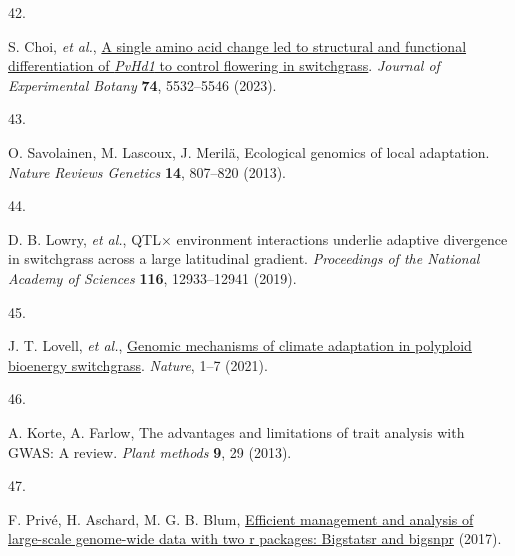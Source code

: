 \documentclass[
  9pt,
  twocolumn,
  twoside]{pnas-new}
\newlength{\cslhangindent}
\newlength{\csllabelwidth}
\newenvironment{CSLReferences}[2] %
 {\begin{list}{}{%
  \setlength{\itemindent}{0pt}
  \setlength{\leftmargin}{0pt}
  \setlength{\parsep}{0pt}
  \ifodd #1
   \setlength{\leftmargin}{\cslhangindent}
   \setlength{\itemindent}{-1\cslhangindent}
  \fi
  \setlength{\itemsep}{#2\baselineskip}}}
 {\end{list}}
\newcommand{\CSLLeftMargin}[1]{\parbox[t]{\csllabelwidth}{\strut#1\strut}}
\newcommand{\CSLRightInline}[1]{\parbox[t]{\linewidth - \csllabelwidth}{\strut#1\strut}}
\begin{document}
\begin{CSLReferences}{0}{1}
\CSLLeftMargin{42. }%
\CSLRightInline{S. Choi, \emph{et al.},
\href{https://doi.org/10.1093/jxb/erad255}{A single amino acid change
led to structural and functional differentiation of {\emph{PvHd1}} to
control flowering in switchgrass}. \emph{Journal of Experimental Botany}
\textbf{74}, 5532--5546 (2023).}

\CSLLeftMargin{43. }%
\CSLRightInline{O. Savolainen, M. Lascoux, J. Merilä, Ecological
genomics of local adaptation. \emph{Nature Reviews Genetics}
\textbf{14}, 807--820 (2013).}

\CSLLeftMargin{44. }%
\CSLRightInline{D. B. Lowry, \emph{et al.}, QTL\(\times\) environment
interactions underlie adaptive divergence in switchgrass across a large
latitudinal gradient. \emph{Proceedings of the National Academy of
Sciences} \textbf{116}, 12933--12941 (2019).}

\CSLLeftMargin{45. }%
\CSLRightInline{J. T. Lovell, \emph{et al.},
\href{https://doi.org/10.1038/s41586-020-03127-1}{Genomic mechanisms of
climate adaptation in polyploid bioenergy switchgrass}. \emph{Nature},
1--7 (2021).}

\CSLLeftMargin{46. }%
\CSLRightInline{A. Korte, A. Farlow, The advantages and limitations of
trait analysis with GWAS: A review. \emph{Plant methods} \textbf{9}, 29
(2013).}

\CSLLeftMargin{47. }%
\CSLRightInline{F. Privé, H. Aschard, M. G. B. Blum,
\href{http://dx.doi.org/10.1101/190926}{Efficient management and
analysis of large-scale genome-wide data with two r packages: Bigstatsr
and bigsnpr} (2017).}

\end{CSLReferences}


\showacknow{} %
\end{document}

